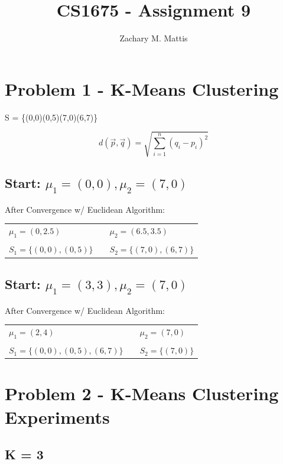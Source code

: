 \documentclass[12pt, letterpaper]{report}
\title{CS1675 - Assignment 9}
\author{Zachary M. Mattis}
\begin{document}
\maketitle

\section{Problem 1 - K-Means Clustering}

S = \{(0,0)(0,5)(7,0)(6,7)\}

\[ d(\vec{p},\vec{q}) = \sqrt{\sum_{i=1}^{n} (q_i-p_i)^2} \]

\subsection{Start: $\mu_1=(0,0), \mu_2=(7,0)$}

After Convergence w/ Euclidean Algorithm:
\\
\begin{table}[H]
	\centering
	\begin{tabular}{ l c l }
		$\mu_1=(0,2.5)$ & \qquad &  $\mu_2=(6.5,3.5)$ \\ \\
		$S_1 = \{(0,0),(0,5)\}$ & \qquad & $S_2 = \{(7,0),(6,7)\}$
	\end{tabular}
\end{table}

\subsection{Start: $\mu_1=(3,3), \mu_2=(7,0)$}

After Convergence w/ Euclidean Algorithm:
\\
\begin{table}[H]
	\centering
	\begin{tabular}{ l c l }
		$\mu_1=(2,4)$ & \qquad &  $\mu_2=(7,0)$ \\ \\
		$S_1 = \{(0,0),(0,5),(6,7)\}$ & \qquad & $S_2 = \{(7,0)\}$
	\end{tabular}
\end{table}

\pagebreak
\section{Problem 2 - K-Means Clustering Experiments}

\subsection{K = 3}
\end{document}
